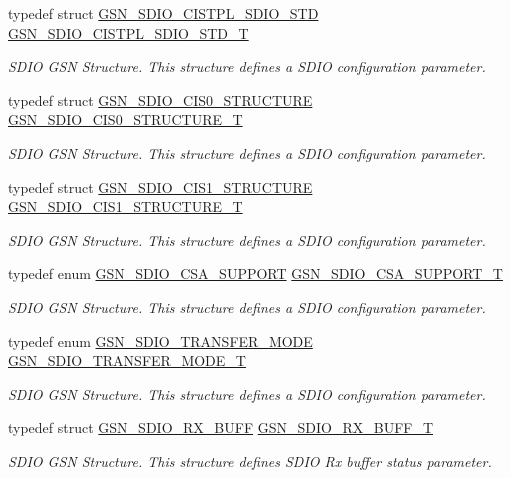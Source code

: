 \begin{DoxyCompactItemize}
typedef struct \hyperlink{a00223}{GSN\_\-SDIO\_\-CISTPL\_\-SDIO\_\-STD} \hyperlink{a00653_gaddb935698da8d7e7e517565c91ddc01b}{GSN\_\-SDIO\_\-CISTPL\_\-SDIO\_\-STD\_\-T}
\begin{DoxyCompactList}\small\item\em SDIO GSN Structure. This structure defines a SDIO configuration parameter. \end{DoxyCompactList}\item 
typedef struct \hyperlink{a00217}{GSN\_\-SDIO\_\-CIS0\_\-STRUCTURE} \hyperlink{a00653_ga2f12cafa4d1da2cd11c4260521e66faa}{GSN\_\-SDIO\_\-CIS0\_\-STRUCTURE\_\-T}
\begin{DoxyCompactList}\small\item\em SDIO GSN Structure. This structure defines a SDIO configuration parameter. \end{DoxyCompactList}\item 
typedef struct \hyperlink{a00218}{GSN\_\-SDIO\_\-CIS1\_\-STRUCTURE} \hyperlink{a00653_ga5f22dc1b4e23d8bf5f7d492e5c786a47}{GSN\_\-SDIO\_\-CIS1\_\-STRUCTURE\_\-T}
\begin{DoxyCompactList}\small\item\em SDIO GSN Structure. This structure defines a SDIO configuration parameter. \end{DoxyCompactList}\item 
typedef enum \hyperlink{a00653_gaf684dd62de548c59407b206cb1a0251c}{GSN\_\-SDIO\_\-CSA\_\-SUPPORT} \hyperlink{a00653_ga0b8def9125739921da58093450df058e}{GSN\_\-SDIO\_\-CSA\_\-SUPPORT\_\-T}
\begin{DoxyCompactList}\small\item\em SDIO GSN Structure. This structure defines a SDIO configuration parameter. \end{DoxyCompactList}\item 
typedef enum \hyperlink{a00653_ga614d231648d595050ca4379ce506d6e0}{GSN\_\-SDIO\_\-TRANSFER\_\-MODE} \hyperlink{a00653_gab2867e08a941d7ecdca09fd9cbeff66c}{GSN\_\-SDIO\_\-TRANSFER\_\-MODE\_\-T}
\begin{DoxyCompactList}\small\item\em SDIO GSN Structure. This structure defines a SDIO configuration parameter. \end{DoxyCompactList}\item 
typedef struct \hyperlink{a00225}{GSN\_\-SDIO\_\-RX\_\-BUFF} \hyperlink{a00653_ga3a7deb851a667b9d2a39d5e1509946ab}{GSN\_\-SDIO\_\-RX\_\-BUFF\_\-T}
\begin{DoxyCompactList}\small\item\em SDIO GSN Structure. This structure defines SDIO Rx buffer status parameter. \end{DoxyCompactList}\item 

\end{DoxyCompactItemize}
